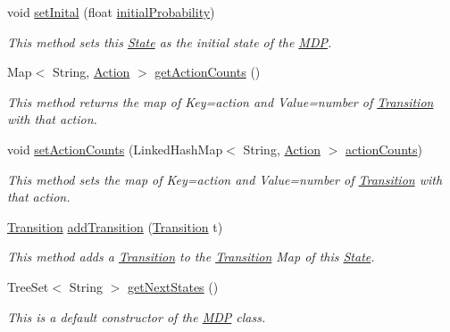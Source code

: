 \begin{DoxyCompactItemize}
void \hyperlink{classmdp_1_1core_1_1_state_ae2b8a26846dfde87eac8dc536b171355}{set\+Inital} (float \hyperlink{classmdp_1_1core_1_1_state_a237d2d5f81db0553a2180cf66a20472b}{initial\+Probability})
\begin{DoxyCompactList}\small\item\em This method sets this \hyperlink{classmdp_1_1core_1_1_state}{State} as the initial state of the \hyperlink{classmdp_1_1core_1_1_m_d_p}{M\+D\+P}. \end{DoxyCompactList}\item 
Map$<$ String, \hyperlink{classmdp_1_1core_1_1_action}{Action} $>$ \hyperlink{classmdp_1_1core_1_1_state_ac4ee428e57bd594d203de402e196cbba}{get\+Action\+Counts} ()
\begin{DoxyCompactList}\small\item\em This method returns the map of Key=action and Value=number of \hyperlink{classmdp_1_1core_1_1_transition}{Transition} with that action. \end{DoxyCompactList}\item 
void \hyperlink{classmdp_1_1core_1_1_state_a38fcd3a67282bf66c86456ed88b065cf}{set\+Action\+Counts} (Linked\+Hash\+Map$<$ String, \hyperlink{classmdp_1_1core_1_1_action}{Action} $>$ \hyperlink{classmdp_1_1core_1_1_state_a8c44f739b3fe71dd166fc6ab59087d4f}{action\+Counts})
\begin{DoxyCompactList}\small\item\em This method sets the map of Key=action and Value=number of \hyperlink{classmdp_1_1core_1_1_transition}{Transition} with that action. \end{DoxyCompactList}\item 
\hyperlink{classmdp_1_1core_1_1_transition}{Transition} \hyperlink{classmdp_1_1core_1_1_state_acc75ae62e5e0fe543bf49b616f88359c}{add\+Transition} (\hyperlink{classmdp_1_1core_1_1_transition}{Transition} t)
\begin{DoxyCompactList}\small\item\em This method adds a \hyperlink{classmdp_1_1core_1_1_transition}{Transition} to the \hyperlink{classmdp_1_1core_1_1_transition}{Transition} Map of this \hyperlink{classmdp_1_1core_1_1_state}{State}. \end{DoxyCompactList}\item 
Tree\+Set$<$ String $>$ \hyperlink{classmdp_1_1core_1_1_state_a3719f4b74033b89c33a756cee4e2b322}{get\+Next\+States} ()
\begin{DoxyCompactList}\small\item\em This is a default constructor of the \hyperlink{classmdp_1_1core_1_1_m_d_p}{M\+D\+P} class. \end{DoxyCompactList}\item 

\end{DoxyCompactItemize}
